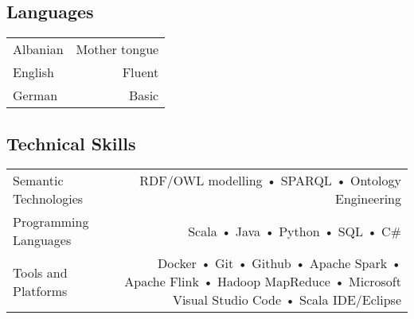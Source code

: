 \subsection*{Languages}
\begin{tabular}{L!{\VRule}R}
Albanian & Mother tongue \\
English & Fluent \\
German & Basic 
\end{tabular}

\subsection*{Technical Skills}
\begin{tabular}{L!{\VRule}R}
	Semantic Technologies & RDF/OWL modelling • SPARQL • Ontology Engineering\\
    Programming Languages & Scala • Java • Python • SQL • C\#\\
     Tools and Platforms & Docker • Git • Github • Apache Spark • Apache Flink • Hadoop MapReduce • Microsoft Visual Studio Code • Scala IDE/Eclipse
\end{tabular}